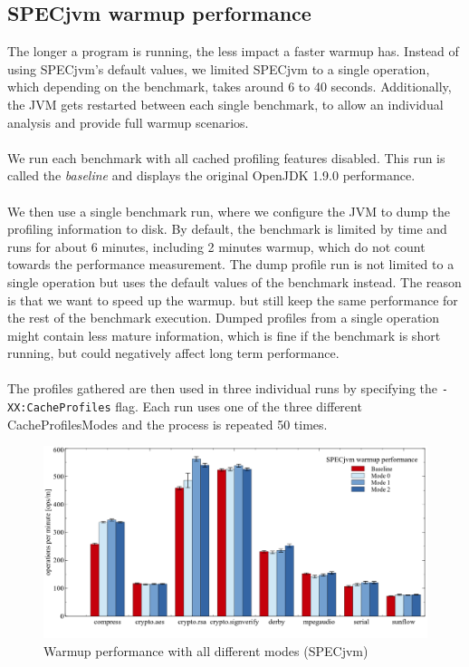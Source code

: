 \subsection{SPECjvm warmup performance}
\label{s:perf_specjvm_warmup}
The longer a program is running, the less impact a faster warmup has. 
Instead of using SPECjvm's default values, we limited SPECjvm to a single operation, which depending on the benchmark, takes around 6 to 40 seconds.
Additionally, the JVM gets restarted between each single benchmark, to allow an individual analysis and provide full warmup scenarios.
\\\\
We run each benchmark with all cached profiling features disabled. This run is called the \textit{baseline} and displays the original OpenJDK 1.9.0 performance.    
\\\\ 
We then use a single benchmark run, where we configure the JVM to dump the profiling information to disk. By default, the benchmark is limited by time and runs for about 6 minutes, including 2 minutes warmup, which do not count towards the performance measurement. The dump profile run is not limited to a single operation but uses the default values of the benchmark instead. The reason is that we want to speed up the warmup. but still keep the same performance for the rest of the benchmark execution. Dumped profiles from a single operation might contain less mature information, which is fine if the benchmark is short running, but could negatively affect long term performance.
\\\\
The profiles gathered are then used in three individual runs by specifying the \texttt{-XX:CacheProfiles} flag. Each run uses one of the three different CacheProfilesModes and the process is repeated 50 times.
\begin{figure}[ht!]
  \begin{center}
    \centering
    \includegraphics[width=1.0\textwidth]{figures/others_warmup.png}
    \caption{Warmup performance with all different modes (SPECjvm)}
    \label{f:others_warmup}
  \end{center}
\end{figure}
